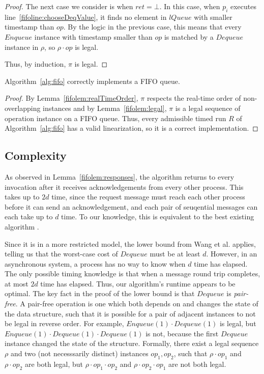 \documentclass[a4paper,anonymous,USenglish]{lipics-v2021}
\theoremstyle{definition}
\begin{document}
\begin{proof}
  The next case we consider is when $ret = \bot$.  In this case, when $p_i$ executes line~\ref{fifoline:chooseDeqValue}, it finds no element in $lQueue$ with smaller timestamp than $op$.  By the logic in the previous case, this means that every $Enqueue$ instance with timestamp smaller than $op$ is matched by a $Dequeue$ instance in $\rho$, so $\rho \cdot op$ is legal.

  Thus, by induction, $\pi$ is legal.
\end{proof}


\begin{theorem}
  Algorithm~\ref{alg:fifo} correctly implements a FIFO queue.
\end{theorem}

\begin{proof}
  By Lemma~\ref{fifolem:realTimeOrder}, $\pi$ respects the real-time order of non-overlapping instances and by Lemma~\ref{fifolem:legal}, $\pi$ is a legal sequence of operation instance on a FIFO queue.  Thus, every admissible timed run $R$ of Algorithm~\ref{alg:fifo} has a valid linearization, so it is a correct implementation.
\end{proof}
 

\subsection{Complexity}

As observed in Lemma~\ref{fifolem:responses}, the algorithm returns to every invocation after it receives acknowledgements from every other process.  This takes up to $2d$ time, since the request message must reach each other process before it can send an acknowledgement, and each pair of seuqential messages can each take up to $d$ time.  To our knowledge, this is equivalent to the best existing algorithm \cite{Lynch96}.

Since it is in a more restricted model, the lower bound from Wang et al. \cite{WangTalmageLeeWelch18} applies, telling us that the worst-case cost of $Dequeue$ must be at least $d$.  However, in an asynchronous system, a process has no way to know when $d$ time has elapsed.  The only possible timing knowledge is that when a message round trip completes, at most $2d$ time has elapsed.  Thus, our algorithm's runtime appears to be optimal.  The key fact in the proof of the lower bound is that $Dequeue$ is \emph{pair-free}.  A pair-free operation \cite{WangTalmageLeeWelch18} is one which both depends on and changes the state of the data structure, such that it is possible for a pair of adjacent instances to not be legal in reverse order.  For example, $Enqueue(1) \cdot Dequeue(1)$ is legal, but $Enqueue(1) \cdot Dequeue(1) \cdot Dequeue(1)$ is not, because the first $Dequeue$ instance changed the state of the structure.  Formally, there exist a legal sequence $\rho$ and two (not necesssarily distinct) instances $op_1, op_2$, such that $\rho \cdot op_1$ and $\rho \cdot op_2$ are both legal, but $\rho \cdot op_1 \cdot op_2$ and $\rho \cdot op_2 \cdot op_1$ are not both legal.
\end{document}
